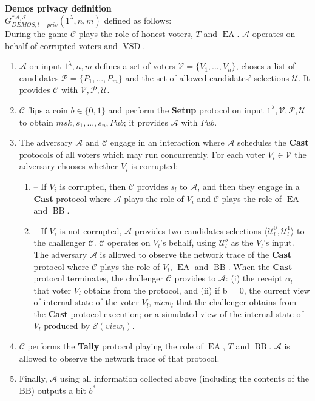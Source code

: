 \documentclass[12pt]{article}
\DeclareMathOperator{\vsd}{VSD}
\DeclareMathOperator{\ea}{EA}
\DeclareMathOperator{\bb}{BB}
\begin{document}
 \textbf{Demos privacy definition}\\
 $G_{DEMOS,t-priv}^{*\mathcal{A}, \mathcal{S}}(1^{\lambda},n,m)$ defined as follows:\\
  
 During the game $\mathcal{C}$ plays the role of honest voters, $T$ and $\ea$. $\mathcal{A}$ operates on behalf of corrupted voters and $\vsd$. 
\begin{enumerate}
\item $\mathcal{A}$ on input $1^{\lambda},n,m$ defines a set of voters  $\mathcal{V} = \{V_1,...,V_n\}$, choses a list of candidates  $\mathcal{P} = \{P_1,...,P_m\}$ and the set of allowed candidates' selections $\mathcal{U}$.  It provides $\mathcal{C}$ with $\mathcal{V}, \mathcal{P}, \mathcal{U}$.
\item $\mathcal{C}$ flips a coin $b\in \{0,1\}$ and perform the \textbf{Setup} protocol on input $1^{\lambda},\mathcal{V}, \mathcal{P}, \mathcal{U}$ to obtain $msk,s_1,...,s_n, Pub$; it provides  $\mathcal{A}$ with $Pub$. 
\item The adversary $\mathcal{A}$  and $\mathcal{C}$ engage in an interaction where $\mathcal{A}$ schedules the \textbf{Cast} protocols of all voters which may run concurrently. For each voter  $V_i \in \mathcal{V}$ the adversary chooses whether $V_i$ is corrupted:
\begin{enumerate}
\item[] -- If $V_i$ is corrupted, then $\mathcal{C}$ provides $s_l$ to $\mathcal{A}$, and then they engage in a  \textbf{Cast} protocol where $\mathcal{A}$ plays the role of $V_i$ and  $\mathcal{C}$ plays the role of $\ea$ and $\bb$.
\item[] --  If $V_i$ is not corrupted, $\mathcal{A}$ provides two candidates selections $\langle \mathcal{U}^0_l , \mathcal{U}^1_l \rangle$ to the challenger $\mathcal{C}$. $\mathcal{C}$ operates on $V_l$'s behalf, using  $\mathcal{U}^b_l$ as the $V_l$'s input. The adversary  $\mathcal{A}$ is allowed to observe the network trace of the \textbf{Cast} protocol where  $\mathcal{C}$ plays the role of $V_l$, $\ea$ and $\bb$. When the  \textbf{Cast} protocol terminates, the challenger  $\mathcal{C}$ provides to $\mathcal{A}$: (i) the receipt $\alpha_l$ that voter $V_l$ obtains from the protocol, and (ii) if b = 0, the current view of internal state of the voter $V_l$, $view_l$ that the challenger obtains from the \textbf{Cast} protocol execution; or  a simulated view of the internal state of $V_l$ produced by $\mathcal{S}(view_l)$.
\end{enumerate}
\item $\mathcal{C}$ performs the  \textbf{Tally} protocol playing the role of $\ea$, $T$  and $\bb$. $\mathcal{A}$ is allowed to observe the network trace of that protocol. 
\item Finally, $\mathcal{A}$ using all information collected above (including the contents of the BB) outputs a bit $b^*$
\end{enumerate}
\end{document}
